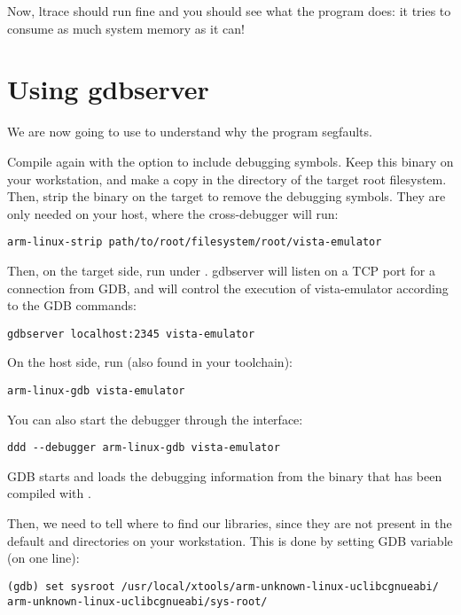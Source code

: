 Now, ltrace should run fine and you should see what the program does:
it tries to consume as much system memory as it can!

\section{Using gdbserver}

We are now going to use  to understand why the program
segfaults.

Compile  again with the  option to
include debugging symbols. Keep this binary on your workstation, and
make a copy in the  directory of the target root
filesystem. Then, strip the binary on the target to remove the
debugging symbols. They are only needed on your host, where the
cross-debugger will run:

\begin{verbatim}
arm-linux-strip path/to/root/filesystem/root/vista-emulator
\end{verbatim}

Then, on the target side, run  under
. gdbserver will listen on a TCP port for a connection
from GDB, and will control the execution of vista-emulator according
to the GDB commands:

\begin{verbatim}
gdbserver localhost:2345 vista-emulator
\end{verbatim}

On the host side, run  (also found in your toolchain):
\begin{verbatim}
arm-linux-gdb vista-emulator
\end{verbatim}

You can also start the debugger through the  interface:
\begin{verbatim}
ddd --debugger arm-linux-gdb vista-emulator
\end{verbatim}

GDB starts and loads the debugging information from the
 binary that has been compiled with .

Then, we need to tell where to find our libraries, since they are not
present in the default  and  directories on
your workstation. This is done by setting GDB  variable
(on one line):

\begin{verbatim}
(gdb) set sysroot /usr/local/xtools/arm-unknown-linux-uclibcgnueabi/
arm-unknown-linux-uclibcgnueabi/sys-root/
\end{verbatim}

